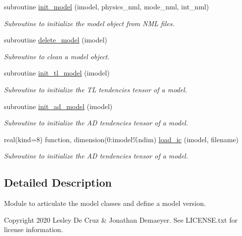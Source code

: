\begin{DoxyCompactItemize}
subroutine \hyperlink{namespacemodel__def_a05a17769a10efe2dd18b5dfb94ac75a2}{init\+\_\+model} (imodel, physics\+\_\+nml, mode\+\_\+nml, int\+\_\+nml)
\begin{DoxyCompactList}\small\item\em Subroutine to initialize the model object from N\+ML files. \end{DoxyCompactList}\item 
subroutine \hyperlink{namespacemodel__def_a10069ccd104ed80ae4ba13bedd1e57e2}{delete\+\_\+model} (imodel)
\begin{DoxyCompactList}\small\item\em Subroutine to clean a model object. \end{DoxyCompactList}\item 
subroutine \hyperlink{namespacemodel__def_a70a2babf6e9897311a4177e864cc5a9e}{init\+\_\+tl\+\_\+model} (imodel)
\begin{DoxyCompactList}\small\item\em Subroutine to initialize the TL tendencies tensor of a model. \end{DoxyCompactList}\item 
subroutine \hyperlink{namespacemodel__def_a0eb49b66f98539511b388dabbf00586c}{init\+\_\+ad\+\_\+model} (imodel)
\begin{DoxyCompactList}\small\item\em Subroutine to initialize the AD tendencies tensor of a model. \end{DoxyCompactList}\item 
real(kind=8) function, dimension(0\+:imodel\%ndim) \hyperlink{namespacemodel__def_aff217ae0244a4b5f7039eb1e6f728cea}{load\+\_\+ic} (imodel, filename)
\begin{DoxyCompactList}\small\item\em Subroutine to initialize the AD tendencies tensor of a model. \end{DoxyCompactList}\end{DoxyCompactItemize}


\subsection{Detailed Description}
Module to articulate the model classes and define a model version. 

\begin{DoxyCopyright}{Copyright}
2020 Lesley De Cruz \& Jonathan Demaeyer. See L\+I\+C\+E\+N\+S\+E.\+txt for license information. 
\end{DoxyCopyright}



